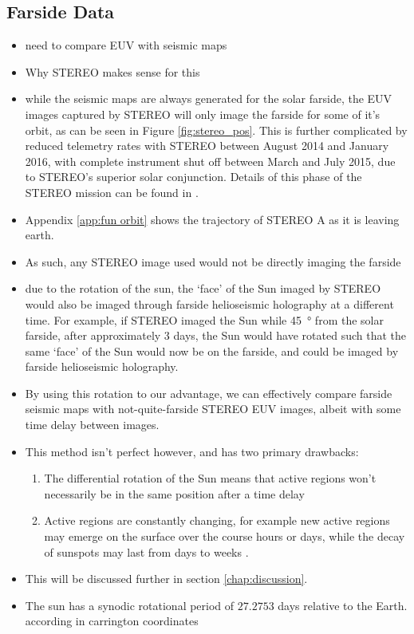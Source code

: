 \documentclass[11pt,a4paper,onecolumn]{report}
\begin{document}
\subsection{Farside Data}
\begin{itemize}
  \item need to compare EUV with seismic maps
  \item Why STEREO makes sense for this
  \item while the seismic maps are always generated for the solar farside, the
        EUV images captured by STEREO will only image the farside for some of
        it's orbit, as can be seen in Figure \ref{fig:stereo_pos}. This is
        further complicated by reduced telemetry rates with STEREO between August 2014 and
        January 2016, with complete instrument shut off between March and July
        2015, due to STEREO's superior solar conjunction. Details of this phase
        of the STEREO mission can be found in \citet{ossing_stereo_2017}.
  \item Appendix \ref{app:fun orbit} shows the trajectory of STEREO A as it is
        leaving earth.
  \item As such, any STEREO image used would not be directly imaging the farside
  \item due to the rotation of the sun, the `face' of the Sun imaged by STEREO
  would also be imaged through farside helioseismic holography at a different
  time. For example, if STEREO imaged the Sun while \SI[]{45}[]{\degree} from
  the solar farside, after approximately 3 days, the Sun would have rotated
  such that the same `face' of the Sun would now be on the farside, and could be
  imaged by farside helioseismic holography.
  \item By using this rotation to our advantage, we can effectively compare
  farside seismic maps with not-quite-farside STEREO EUV images, albeit with
  some time delay between images.
  \item This method isn't perfect however, and has two primary drawbacks:
  \begin{enumerate}
    \item The differential rotation of the Sun means that active regions won't
    necessarily be in the same position after a time delay
    \item Active regions are constantly changing, for example new active regions may emerge on the surface over the course hours or days,
    while the decay of sunspots may last from days to weeks
    \citep{van_driel-gesztelyi_evolution_2015}.
  \end{enumerate}
  \item This will be discussed further in section \ref{chap:discussion}.
  \item The sun has a synodic rotational period of \(27.2753\) days relative to
  the Earth. according in carrington coordinates
\end{itemize}
\end{document}
